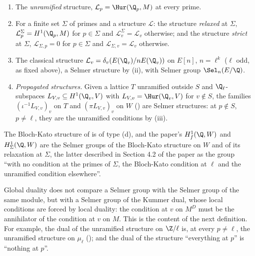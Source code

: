 \begin{example}\label{ex:galcoh:selmer-structures}
\begin{enumerate}[label=(\alph*)]
\item The \emph{unramified} structure, $\mathcal L_p=\Hur(\Q_p,M)$ at every prime.
\item For a finite set $\Sigma$ of primes and a structure $\mathcal L$: the structure \emph{relaxed} at $\Sigma$, $\mathcal L^\Sigma_p=H^1(\Q_p,M)$ for $p\in\Sigma$ and $\mathcal L^\Sigma_v=\mathcal L_v$
otherwise; and the structure \emph{strict} at $\Sigma$, $\mathcal L_{\Sigma,p}=0$ for $p\in\Sigma$ and $\mathcal L_{\Sigma,v}=\mathcal L_v$ otherwise.
\item The classical structure $\mathcal L_v=\delta_v(E(\Q_v)/nE(\Q_v))$ on $E[n]$, $n=\ell^k$ ($\ell$ odd, as fixed above), a Selmer structure by (ii), with Selmer group
$\Sel_n(E/\Q)$.
\item \emph{Propagated structures.} Given a lattice $T$ unramified outside $S$ and $\Q_\ell$-subspaces $L_{V,v}\subseteq H^1(\Q_v,V)$ with $L_{V,v}=\Hur(\Q_v,V)$ for $v\notin S$, the
families $(\iota^{-1}L_{V,v})_v$ on $T$ and $(\pi L_{V,v})_v$ on $W$ () are Selmer structures: at $p\notin S$, $p\ne\ell$, they are the unramified
conditions by (iii).
\end{enumerate}
The Bloch-Kato structure of  is of type (d), and the paper's $H^1_f(\Q,W)$ and $H^1_\Sigma(\Q,W)$ are the Selmer groups of the Bloch-Kato structure on $W$
and of its relaxation at $\Sigma$, the latter described in Section 4.2 of the paper as the group ``with no condition at the primes of $\Sigma$, the Bloch-Kato condition at
$\ell$ and the unramified condition elsewhere''.
\end{example}

Global duality does not compare a Selmer group with the Selmer group of the same module, but with a Selmer group of the Kummer dual, whose local conditions are
forced by local duality: the condition at $v$ on $M^D$ must be the annihilator of the condition at $v$ on $M$. This is the content of the next definition. For example,
the dual of the unramified structure on $\Z/\ell$ is, at every $p\ne\ell$, the unramified structure on $\mu_\ell$ (); and the dual of the
structure ``everything at $p$'' is ``nothing at $p$''.

